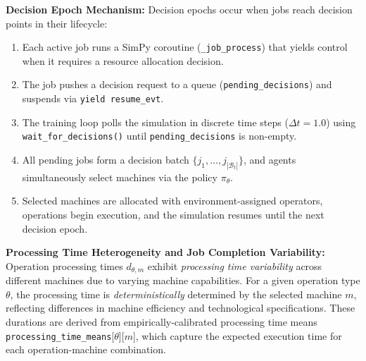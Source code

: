 \textbf{Decision Epoch Mechanism:} Decision epochs occur when jobs reach decision points in their lifecycle:
\begin{enumerate}
    \item Each active job runs a SimPy coroutine (\texttt{\_job\_process}) that yields control when it requires a resource allocation decision.
    \item The job pushes a decision request to a queue (\texttt{pending\_decisions}) and suspends via \texttt{yield resume\_evt}.
    \item The training loop polls the simulation in discrete time steps (\( \Delta t = 1.0 \)) using \texttt{wait\_for\_decisions()} until \texttt{pending\_decisions} is non-empty.
    \item All pending jobs form a decision batch \( \{j_1, \ldots, j_{|\mathcal{B}_t|}\} \), and agents simultaneously select machines via the policy \( \pi_\theta \).
    \item Selected machines are allocated with environment-assigned operators, operations begin execution, and the simulation resumes until the next decision epoch.
\end{enumerate}

\textbf{Processing Time Heterogeneity and Job Completion Variability:}
Operation processing times \( d_{\theta,m} \) exhibit \textit{processing time variability} across different machines due to varying machine capabilities. For a given operation type \( \theta \), the processing time is \textit{deterministically} determined by the selected machine \( m \), reflecting differences in machine efficiency and technological specifications. These durations are derived from empirically-calibrated processing time means 
\texttt{processing\_time\_means}[\(\theta\)][\(m\)], which capture the expected execution time for each operation-machine combination.

